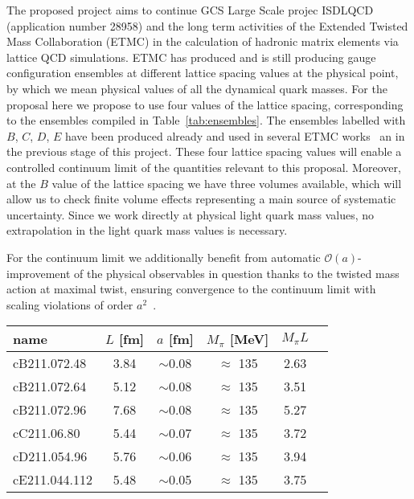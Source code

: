 
The proposed project aims to continue GCS Large Scale projec ISDLQCD
(application number 28958) and the long term activities of the
Extended Twisted Mass Collaboration (ETMC) in the calculation of
hadronic matrix elements via lattice QCD simulations. ETMC has
produced and is still producing gauge configuration ensembles at
different lattice spacing values at the physical point, by which we
mean physical values of all the dynamical quark masses. For the
proposal here we propose to use four values of the lattice spacing,
corresponding to the ensembles compiled in Table~\ref{tab:ensembles}. The
ensembles labelled with $B$, $C$, $D$, $E$ have been produced already
and used in several ETMC
works~\cite{ExtendedTwistedMass:2021qui,ExtendedTwistedMass:2021gbo,ExtendedTwistedMass:2022jpw,ExtendedTwistedMassCollaborationETMC:2022sta}
an in the previous stage of this project.
These four lattice spacing values will enable a controlled continuum
limit of the quantities relevant to this proposal.
Moreover, at the $B$ value of the lattice spacing we have
three volumes available, which will allow us to check finite volume
effects representing a main source of systematic uncertainty.
Since we work directly at physical light quark mass values, no
extrapolation in the light quark mass values is necessary.

For the continuum limit we additionally benefit from automatic
$\mathcal{O}(a)$-improvement of the physical observables in question
thanks to the twisted mass action at
maximal twist, ensuring convergence to the continuum
limit with scaling violations of order $a^2$~\cite{Frezzotti:2003ni}.

\begin{SCtable}[.4]
	\centering %
	\begin{tabular}{lccccr} %
		\toprule
		name          & $L$ [fm]      & $a$
		[fm]          & $M_\pi$ [MeV] & $M_\pi L$                         \\
		\midrule
		\midrule
		cB211.072.48  & 3.84          & $\sim$0.08 & $\approx$ 135 & 2.63 \\
		cB211.072.64  & 5.12          & $\sim$0.08 & $\approx$ 135 & 3.51 \\
		cB211.072.96  & 7.68          & $\sim$0.08 & $\approx$ 135 & 5.27 \\
		\hline
		cC211.06.80   & 5.44          & $\sim$0.07 & $\approx$ 135 & 3.72 \\
		\hline
		cD211.054.96  & 5.76          & $\sim$0.06 & $\approx$ 135 & 3.94 \\
		\hline
		cE211.044.112 & 5.48          & $\sim$0.05 & $\approx$ 135 & 3.75 \\
		\bottomrule
	\end{tabular}
	\caption{ETMC's $N_f=2+1+1$ gauge ensembles relevant for this
		proposal. The time extent is always set to $T=2L$.}
	\label{tab:ensembles}
\end{SCtable}

